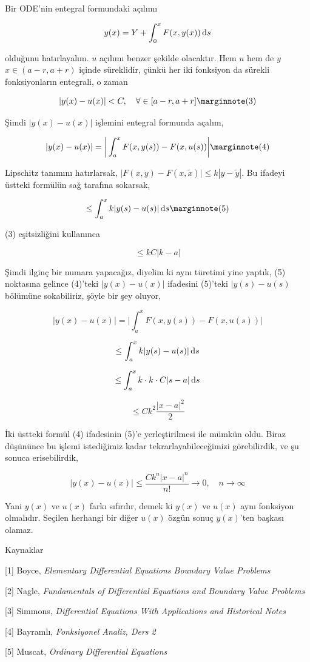 \documentclass[12pt,fleqn]{article}\usepackage{../../common}
\begin{document}
Bir ODE'nin entegral formundaki açılımı

$$
y(x) = Y + \int_{0}^{x} F(x,y(x)) \,\mathrm{d} s
$$

olduğunu hatırlayalım. $u$ açılımı benzer şekilde olacaktır. Hem $u$ hem de $y$
$x \in (a-r,a+r)$ içinde süreklidir, çünkü her iki fonksiyon da sürekli
fonksiyonların entegrali, o zaman

$$
|y(x)-u(x)| < C, \quad \forall \in [a-r,a+r]
\mlabel{3}
$$

Şimdi $|y(x)-u(x)|$ işlemini entegral formunda açalım,

$$
|y(x)-u(x)| = \bigg| \int _{a}^{x}  F(x,y(s)) - F(x,u(s)) \bigg|
\mlabel{4}
$$

Lipschitz tanımını hatırlarsak, $\big| F(x,y) - F(x,\tilde{x}) \big| \le k |y-\tilde{y}|$.
Bu ifadeyi üstteki formülün sağ tarafına sokarsak,

$$
\le \int _{a}^{x} k|y(s)-u(s) | \ud s
\mlabel{5}
$$

(3) eşitsizliğini kullanınca

$$
\le k C |k-a|
$$

Şimdi ilginç bir numara yapacağız, diyelim ki aynı türetimi yine yaptık, (5)
noktasına gelince (4)'teki $|y(x)-u(x)|$ ifadesini (5)'teki $|y(s)-u(s)$
bölümüne sokabiliriz, şöyle bir şey oluyor,

$$
|y(x)-u(x)| = \bigg| \int _{a}^{x}  F(x,y(s)) - F(x,u(s)) \bigg|
$$

$$
\le \int _{a}^{x} k|y(s)-u(s) | \,\mathrm{d} s
$$

$$
\le \int _{a}^{x} k \cdot k \cdot C |s-a| \,\mathrm{d} s
$$

$$
\le C k^2 \frac{|x-a|^2}{2}
$$

İki üstteki formül (4) ifadesinin (5)'e yerleştirilmesi ile mümkün oldu. Biraz
düşününce bu işlemi istediğimiz kadar tekrarlayabileceğimizi görebilirdik, ve şu
sonuca erisebilirdik,

$$
|y(x)-u(x)| \le \frac{C k^n |x-a|^n}{n!} \to 0, \quad n \to \infty
$$

Yani $y(x)$ ve $u(x)$ farkı sıfırdır, demek ki $y(x)$ ve $u(x)$ aynı fonksiyon
olmalıdır. Seçilen herhangi bir diğer $u(x)$ özgün sonuç $y(x)$'ten başkası
olamaz.

Kaynaklar

[1] Boyce, {\em Elementary Differential Equations Boundary Value Problems}

[2] Nagle, {\em Fundamentals of Differential Equations and Boundary Value Problems}

[3] Simmons, {\em Differential Equations With Applications and Historical Notes}

[4] Bayramlı, {\em Fonksiyonel Analiz, Ders 2}

[5] Muscat, {\em Ordinary Differential Equations}
\end{document}
